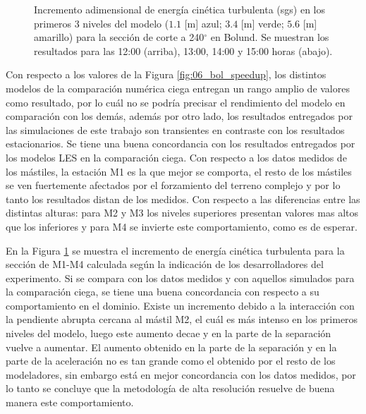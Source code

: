 \begin{figure}[H]
	\caption{Incremento adimensional de energía cinética turbulenta (sgs) en los primeros 3 niveles del modelo ($1.1$ [m] azul; $3.4$ [m] verde; $5.6$ [m] amarillo) para la sección de corte a 240$^\circ$ en Bolund. Se muestran los resultados para las 12:00 (arriba), 13:00, 14:00 y 15:00 horas (abajo).}
	\label{fig:06_bol_tke}
\end{figure}
Con respecto a los valores de la Figura \ref{fig:06_bol_speedup}, los distintos modelos de la comparación numérica ciega entregan un rango amplio de valores como resultado, por lo cuál no se podría precisar el rendimiento del modelo en comparación con los demás, además por otro lado, los resultados entregados por las simulaciones de este trabajo son transientes en contraste con los resultados estacionarios. Se tiene una buena concordancia con los resultados entregados por los modelos LES en la comparación ciega. Con respecto a los datos medidos de los mástiles, la estación M1 es la que mejor se comporta, el resto de los mástiles se ven fuertemente afectados por el forzamiento del terreno complejo y por lo tanto los resultados distan de los medidos. Con respecto a las diferencias entre las distintas alturas: para M2 y M3 los niveles superiores presentan valores mas altos que los inferiores y para M4 se invierte este comportamiento, como es de esperar. 

En la Figura \ref{fig:06_bol_tke} se muestra el incremento de energía cinética turbulenta para la sección de M1-M4 calculada según la indicación de los desarrolladores del experimento. Si se compara con los datos medidos y con aquellos simulados para la comparación ciega, se tiene una buena concordancia con respecto a su comportamiento en el dominio. Existe un incremento debido a la interacción con la pendiente abrupta cercana al mástil M2, el cuál es más intenso en los primeros niveles del modelo, luego este aumento decae y en la parte de la separación vuelve a aumentar. El aumento obtenido en la parte de la separación y en la parte de la aceleración no es tan grande como el obtenido por el resto de los modeladores, sin embargo está en mejor concordancia con los datos medidos, por lo tanto se concluye que la metodología de alta resolución resuelve de buena manera este comportamiento.

